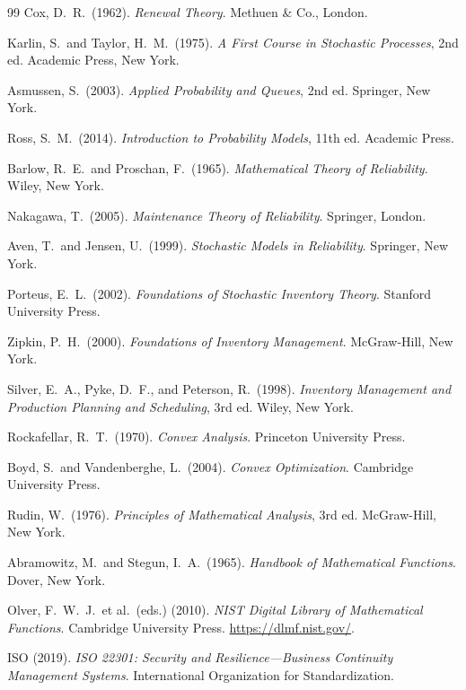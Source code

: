 \documentclass[12pt,a4paper]{article}
\theoremstyle{plain}
\theoremstyle{definition}
\theoremstyle{remark}
\begin{document}
\begin{thebibliography}{99}
Cox, D.\ R.\ (1962).
\textit{Renewal Theory}.
Methuen \& Co., London.

Karlin, S.\ and Taylor, H.\ M.\ (1975).
\textit{A First Course in Stochastic Processes},
2nd ed.
Academic Press, New York.

Asmussen, S.\ (2003).
\textit{Applied Probability and Queues},
2nd ed.
Springer, New York.

Ross, S.\ M.\ (2014).
\textit{Introduction to Probability Models},
11th ed.
Academic Press.

Barlow, R.\ E.\ and Proschan, F.\ (1965).
\textit{Mathematical Theory of Reliability}.
Wiley, New York.

Nakagawa, T.\ (2005).
\textit{Maintenance Theory of Reliability}.
Springer, London.

Aven, T.\ and Jensen, U.\ (1999).
\textit{Stochastic Models in Reliability}.
Springer, New York.

Porteus, E.\ L.\ (2002).
\textit{Foundations of Stochastic Inventory Theory}.
Stanford University Press.

Zipkin, P.\ H.\ (2000).
\textit{Foundations of Inventory Management}.
McGraw-Hill, New York.

Silver, E.\ A., Pyke, D.\ F., and Peterson, R.\ (1998).
\textit{Inventory Management and Production Planning and Scheduling},
3rd ed.
Wiley, New York.

Rockafellar, R.\ T.\ (1970).
\textit{Convex Analysis}.
Princeton University Press.

Boyd, S.\ and Vandenberghe, L.\ (2004).
\textit{Convex Optimization}.
Cambridge University Press.

Rudin, W.\ (1976).
\textit{Principles of Mathematical Analysis},
3rd ed.
McGraw-Hill, New York.

Abramowitz, M.\ and Stegun, I.\ A.\ (1965).
\textit{Handbook of Mathematical Functions}.
Dover, New York.

Olver, F.\ W.\ J.\ et al.\ (eds.) (2010).
\textit{NIST Digital Library of Mathematical Functions}.
Cambridge University Press.
\url{https://dlmf.nist.gov/}.

ISO (2019).
\textit{ISO 22301: Security and Resilience---Business Continuity
Management Systems}.
International Organization for Standardization.


\end{thebibliography}
\end{document}
